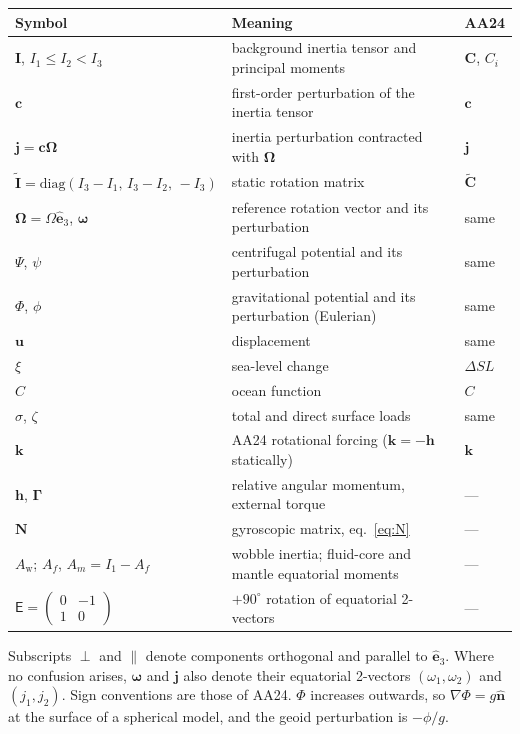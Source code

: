 \documentclass[11pt,a4paper]{article}
\newcommand{\bO}{\bm{\Omega}}
\newcommand{\bw}{\bm{\omega}}
\newcommand{\bu}{\mathbf{u}}
\newcommand{\bj}{\mathbf{j}}
\newcommand{\bc}{\mathbf{c}}
\newcommand{\bk}{\mathbf{k}}
\newcommand{\bh}{\mathbf{h}}
\newcommand{\bI}{\mathbf{I}}
\newcommand{\It}{\tilde{\mathbf{I}}}
\newcommand{\bN}{\mathbf{N}}
\newcommand{\bGam}{\bm{\Gamma}}
\newcommand{\bn}{\hat{\mathbf{n}}}
\newcommand{\be}{\hat{\mathbf{e}}}
\newcommand{\E}{\mathsf{E}}
\newcommand{\Aw}{A_{\mathrm w}}
\begin{document}
\begin{center}
\small
\begin{tabular}{@{}lll@{}}
\toprule
Symbol & Meaning & AA24\\
\midrule
$\bI$, $I_1\le I_2<I_3$ & background inertia tensor and principal moments & $\mathbf{C}$, $C_i$\\
$\bc$ & first-order perturbation of the inertia tensor & $\mathbf{c}$\\
$\bj=\bc\bO$ & inertia perturbation contracted with $\bO$ & $\mathbf{j}$\\
$\It=\mathrm{diag}(I_3-I_1,\,I_3-I_2,\,-I_3)$ & static rotation matrix & $\tilde{\mathbf{C}}$\\
$\bO=\Omega\be_3$, $\bw$ & reference rotation vector and its perturbation & same\\
$\Psi$, $\psi$ & centrifugal potential and its perturbation & same\\
$\Phi$, $\phi$ & gravitational potential and its perturbation (Eulerian) & same\\
$\bu$ & displacement & same\\
$\xi$ & sea-level change & $\Delta SL$\\
$C$ & ocean function & $C$\\
$\sigma$, $\zeta$ & total and direct surface loads & same\\
$\bk$ & AA24 rotational forcing ($\bk=-\bh$ statically) & $\mathbf{k}$\\
$\bh$, $\bGam$ & relative angular momentum, external torque & ---\\
$\bN$ & gyroscopic matrix, eq.~\eqref{eq:N} & ---\\
$\Aw$; $A_f$, $A_m=I_1-A_f$ & wobble inertia; fluid-core and mantle equatorial moments & ---\\
$\E=\begin{pmatrix}0&-1\\1&0\end{pmatrix}$ & $+90^\circ$ rotation of equatorial 2-vectors & ---\\
\bottomrule
\end{tabular}
\end{center}
Subscripts $\perp$ and $\parallel$ denote components orthogonal and parallel to $\be_3$. Where
no confusion arises, $\bw$ and $\bj$ also denote their equatorial 2-vectors $(\omega_1,\omega_2)$ and
$(j_1,j_2)$. Sign conventions are those of AA24. $\Phi$ increases outwards, so
$\nabla\Phi=g\bn$ at the surface of a spherical model, and the geoid perturbation is $-\phi/g$.
\end{document}
